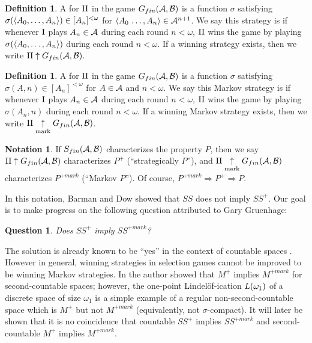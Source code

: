 \documentclass{amsart}
\theoremstyle{plain}
\newtheorem{question}[theorem]{Question}
\theoremstyle{definition}
\newtheorem{definition}[theorem]{Definition}
\newtheorem{notation}[theorem]{Notation}
\theoremstyle{remark}
\theoremstyle{plain}
\theoremstyle{definition}
\theoremstyle{remark}
\begin{document}
\begin{definition}
  A  for \(\mathrm{II}\) in the game \(G_{fin}(\mathcal{A},\mathcal{B})\)
  is a function \(\sigma\) satisfying
  \(\sigma(\langle A_0,\dots,A_n\rangle)\in[A_n]^{<\omega}\) for
  \(\langle A_0\,\dots,A_n\rangle\in\mathcal{A}^{n+1}\). We say this strategy is
   if whenever \(\mathrm{I}\) plays \(A_n\in\mathcal{A}\) during each
  round \(n<\omega\), \(\mathrm{II}\) wins the game by playing
  \(\sigma(\langle A_0,\dots,A_n\rangle)\) during each round \(n<\omega\).
  If a winning strategy exists, then we write
  \(\mathrm{II}\uparrow G_{fin}(\mathcal{A},\mathcal{B})\).
\end{definition}

\begin{definition}
  A  for \(\mathrm{II}\) in the game
  \(G_{fin}(\mathcal{A},\mathcal{B})\)
  is a function \(\sigma\) satisfying
  \(\sigma(A,n)\in[A_n]^{<\omega}\) for
  \(A\in\mathcal{A}\) and \(n<\omega\). We say this Markov strategy is
   if whenever \(\mathrm{I}\) plays \(A_n\in\mathcal{A}\) during each
  round \(n<\omega\), \(\mathrm{II}\) wins the game by playing
  \(\sigma(A_n,n)\) during each round \(n<\omega\).
  If a winning Markov strategy exists, then we write
  \(\mathrm{II}\underset{\text{mark}}{\uparrow}G_{fin}(\mathcal{A},\mathcal{B})\).
\end{definition}

\begin{notation}
  If \(S_{fin}(\mathcal{A},\mathcal{B})\) characterizes the property \(P\),
  then we say \(\mathrm{II}\uparrow G_{fin}(\mathcal{A},\mathcal{B})\) characterizes
  \(P^+\) (``strategically \(P\)''), and
  \(\mathrm{II}\underset{\text{mark}}{\uparrow}G_{fin}(\mathcal{A},\mathcal{B})\) characterizes
  \(P^{+mark}\) (``Markov \(P\)'').
  Of course, \(P^{+mark}\Rightarrow P^+ \Rightarrow P\).
\end{notation}

In this notation,
Barman and Dow showed that \(SS\) does not imply
\(SS^+\). Our goal is to make progress on the following question
attributed to Gary Gruenhage:

\begin{question}\label{mainQuestion}
  Does \(SS^+\) imply \(SS^{+mark}\)?
\end{question}

The solution is already known to be ``yes'' in the context of countable spaces
\cite{MR2678950}. However in general, winning strategies in selection games
cannot be improved to be winning Markov strategies. In
\cite{clontzMengerCMUC} the author showed that \(M^+\) implies
\(M^{+mark}\) for second-countable spaces; however, the one-point
Lindel\"of-ication \(L(\omega_1)\) of a discrete space of size
\(\omega_1\) is a simple
example of a regular non-second-countable space which is
\(M^+\) but not \(M^{+mark}\) (equivalently, not \(\sigma\)-compact).
It will later be shown that it is no coincidence
that countable \(SS^+\) implies \(SS^{+mark}\) and
second-countable \(M^+\) implies \(M^{+mark}\).
\end{document}
